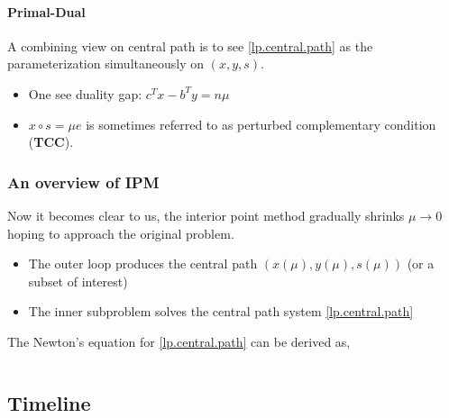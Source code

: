\documentclass[main]{subfiles}
\begin{document}
\paragraph{Primal-Dual} A combining view on central path is to see \eqref{lp.central.path} as the parameterization simultaneously on \((x, y, s)\).
\begin{itemize}
    \item One see duality gap: \(c^Tx - b^Ty = n\mu\)
    \item \(x \circ s =\mu e\) is sometimes referred to as perturbed complementary condition (\textbf{TCC}).
\end{itemize}

\subsubsection{An overview of IPM}

Now it becomes clear to us, the interior point method gradually shrinks \(\mu \to 0\) hoping to approach the original problem.
\begin{itemize}
    \item The outer loop produces the central path \(\left(x(\mu), y(\mu), s(\mu)\right)\) (or a subset of interest)
    \item The inner subproblem solves the central path system \eqref{lp.central.path}
\end{itemize}

The Newton's equation for \eqref{lp.central.path} can be derived as,

\begin{equation}
    
\end{equation}


\subsection{Timeline}



\end{document}
